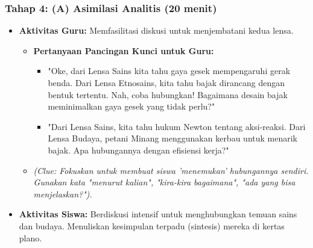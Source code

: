 \documentclass[12pt,a4paper]{article}
\begin{document}
\subsubsection{Tahap 4: (A) Asimilasi Analitis (20 menit)}
\begin{itemize}
\item \textbf{Aktivitas Guru:} Memfasilitasi diskusi untuk menjembatani kedua lensa.
    \begin{itemize}
    \item \textbf{Pertanyaan Pancingan Kunci untuk Guru:}
        \begin{itemize}
        \item "Oke, dari Lensa Sains kita tahu gaya gesek mempengaruhi gerak benda. Dari Lensa Etnosains, kita tahu bajak dirancang dengan bentuk tertentu. Nah, coba hubungkan! Bagaimana desain bajak meminimalkan gaya gesek yang tidak perlu?"
        \item "Dari Lensa Sains, kita tahu hukum Newton tentang aksi-reaksi. Dari Lensa Budaya, petani Minang menggunakan kerbau untuk menarik bajak. Apa hubungannya dengan efisiensi kerja?"
        \end{itemize}
    \item \textit{(Clue: Fokuskan untuk membuat siswa 'menemukan' hubungannya sendiri. Gunakan kata "menurut kalian", "kira-kira bagaimana", "ada yang bisa menjelaskan?").}
    \end{itemize}
\item \textbf{Aktivitas Siswa:} Berdiskusi intensif untuk menghubungkan temuan sains dan budaya. Menuliskan kesimpulan terpadu (sintesis) mereka di kertas plano.
\end{itemize}
\end{document}
